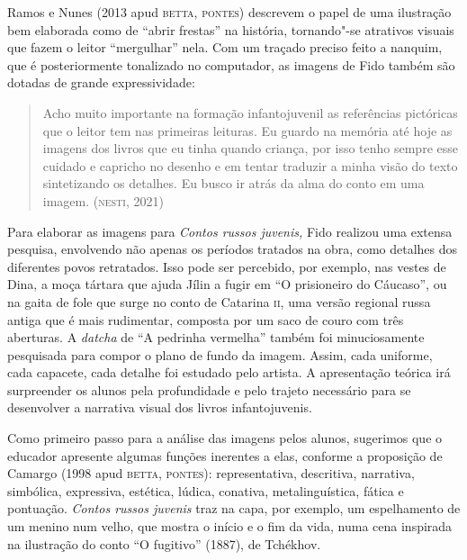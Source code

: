 \documentclass[11pt]{extarticle}
\begin{document}
Ramos e Nunes (2013 apud \textsc{betta}, \textsc{pontes}) descrevem o papel de uma
ilustração bem elaborada como de ``abrir frestas'' na história,
tornando"-se atrativos visuais que fazem o leitor ``mergulhar'' nela. Com
um traçado preciso feito a nanquim, que é posteriormente tonalizado no
computador, as imagens de Fido também são dotadas de grande
expressividade:

\begin{quote}
Acho muito importante na formação infantojuvenil as referências
pictóricas que o leitor tem nas primeiras leituras. Eu guardo na memória
até hoje as imagens dos livros que eu tinha quando criança, por isso
tenho sempre esse cuidado e capricho no desenho e em tentar traduzir a
minha visão do texto sintetizando os detalhes. Eu busco ir atrás da alma
do conto em uma imagem. (\textsc{nesti}, 2021)
\end{quote}

Para elaborar as imagens para \emph{Contos russos juvenis,} Fido
realizou uma extensa pesquisa, envolvendo não apenas os períodos
tratados na obra, como detalhes dos diferentes povos retratados. Isso
pode ser percebido, por exemplo, nas vestes de Dina, a moça tártara que
ajuda Jílin a fugir em ``O prisioneiro do Cáucaso'', ou na gaita
de fole que surge no conto de Catarina \textsc{ii}, uma versão regional russa
antiga que é mais rudimentar, composta por um saco de couro com três
aberturas. A \emph{datcha} de ``A pedrinha vermelha'' também foi
minuciosamente pesquisada para compor o plano de fundo da imagem. Assim,
cada uniforme, cada capacete, cada detalhe foi estudado pelo artista. A
apresentação teórica irá surpreender os alunos pela profundidade e pelo
trajeto necessário para se desenvolver a narrativa visual dos livros
infantojuvenis.


Como primeiro passo para a análise das imagens pelos alunos, sugerimos
que o educador apresente algumas funções inerentes a elas, conforme a
proposição de Camargo (1998 apud \textsc{betta}, \textsc{pontes}): representativa,
descritiva, narrativa, simbólica, expressiva, estética, lúdica,
conativa, metalinguística, fática e pontuação. \emph{Contos russos
juvenis} traz na capa, por exemplo, um espelhamento de um menino num
velho, que mostra o início e o fim da vida, numa cena inspirada na
ilustração do conto ``O fugitivo'' (1887), de Tchékhov.
\end{document}
